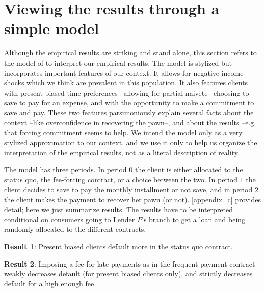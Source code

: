 \documentclass[oneside,11pt]{article}
\begin{document}
\section{Viewing the results through a simple model} \label{model}

Although the empirical results are striking and stand alone, this section refers to the model of \cite{John} to interpret our empirical results. The model is stylized but incorporates important features of our context. It allows for negative income shocks which we think are prevalent in this population. %
It also features clients with present biased time preferences --allowing for partial naivete-- choosing to save to pay for an expense, and with the opportunity to make a commitment to save and pay. These two features parsimoniously explain several facts about the context --like overconfidence in recovering the pawn--, and about the results --e.g. that forcing commitment seems to help. We intend the model only as a very stylized approximation to our context, and we use it only to help us organize the interpretation of the empirical results, not as a literal description of reality. %

The model has three periods. In period $0$ the client is either allocated to the status quo, the fee-forcing contract, or a choice between the two. In period  $1$ the client decides to save to pay the monthly installment or not save, and in period $2$ the client makes the payment to recover her pawn (or not). \ref{appendix_c} provides detail; here we just summarize results. The results have to be interpreted conditional on consumers going to Lender $P$'s branch to get a loan and being randomly allocated to the different contracts. %

\vspace{.1in}
\noindent \textbf{Result 1}: Present biased clients default more in the status quo contract.

\vspace{.1in}
\noindent \textbf{Result 2}: Imposing a fee  for late payments as in the frequent payment contract weakly decreases default (for present biased clients only), and strictly decreases default for a high enough fee. 
\end{document}
